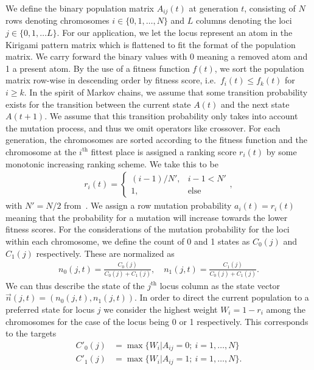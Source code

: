 We define the binary population matrix $A_{ij}(t)$ at generation $t$, consisting of
$N$ rows denoting chromosomes $i \in \{0, 1, \ldots, N\}$ and $L$ columns denoting the loci $j \in \{0, 1, \ldots L\}$. For our application, we let the locus represent an atom in the Kirigami pattern matrix which is flattened to fit the format of the population matrix. We carry forward the binary values with 0 meaning a removed atom and 1 a present atom. By the use of a fitness function $f(t)$, we sort the population matrix row-wise in descending order by fitness score, i.e.\ $f_i(t) \le f_k(t)$ for $i \ge k$. In the spirit of Markov chains, we assume that some transition probability exists for the transition between the current state
$A(t)$ and the next state $A(t+1)$. We assume that this transition probability
only takes into account the mutation process, and thus we omit operators like
crossover. For each generation, the chromosomes are sorted according to the
fitness function and the chromosome at the $i^{\text{th}}$ fittest place is assigned a ranking score $r_i(t)$ by some monotonic increasing ranking scheme. We take this to be
\begin{align*}
  r_i(t) = 
  \begin{cases}
    (i-1)/N',& i-1 < N' \\
    1, &\text{else}
  \end{cases},
\end{align*}
with $N' = N/2$ from~\cite{Wang2010}. We assign a row mutation probability $a_i(t) = r_i(t)$ meaning that the probability for a mutation will increase towards the lower fitness scores. For the considerations of the mutation probability for the loci within each chromosome, we define the count of 0 and 1 states as $C_0(j)$ and $C_1(j)$ respectively. These are normalized as
\begin{align*}
  n_0(j, t) = \frac{C_0(j)}{C_0(j) + C_1(j)}, \quad n_1(j, t) = \frac{C_1(j)}{C_0(j) + C_1(j)}.
\end{align*}
We can thus describe the state of the $j^{\text{th}}$ locus column as the state vector $\vec{n}(j,t)=(n_0(j, t), n_1(j, t))$. In order to direct the current population to a preferred state for locus $j$ we consider the highest weight $W_i = 1 - r_i$ among the chromosomes for the case of the locus being 0 or 1 respectively. This corresponds to the targets
\begin{align*}
  C'_0(j) &= \max\{W_i | A_{ij} = 0; \ i = 1, \ldots, N\} \\
  C'_1(j) &= \max\{W_i | A_{ij} = 1; \ i = 1, \ldots, N\}.
\end{align*}
